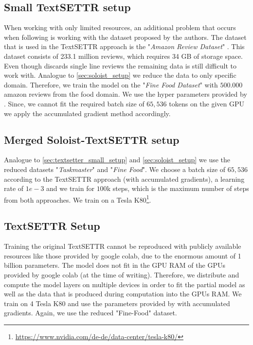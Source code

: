 \documentclass[twocolumn]{tum-article}
\begin{document}
\subsection{Small TextSETTR setup}\label{sec:textsetter_small_setup}
When working with only limited resources, an additional problem that occurs when following \cite{riley2020textsettr} is working with the dataset proposed by the authors. The dataset that is used in the TextSETTR approach is the "\textit{Amazon Review Dataset}" \cite{ni2019justifying}. This dataset consists of 233.1 million reviews, which requires 34 GB of storage space. Even though \cite{riley2020textsettr} discards single line reviews the remaining data is still difficult to work with. Analogue to \autoref{sec:soloist_setup} we reduce the data to only specific domain. Therefore, we train the model on the "\textit{Fine Food Dataset}" \cite{mcauley2013amateurs} with $500.000$ amazon reviews from the food domain. We use the hyper parameters provided by \cite{riley2020textsettr}. Since, we cannot fit the required batch size of $65,536$ tokens on the given GPU we apply the accumulated gradient method accordingly. 
\subsection{Merged Soloist-TextSETTR setup}\label{sec:soloist_textsettr_setup}
Analogue to \autoref{sec:textsetter_small_setup} and \autoref{sec:soloist_setup} we use the reduced datasets "\textit{Taskmaster}" and "\textit{Fine Food}". We choose a batch size of $65,536$ according to the TextSETTR approach (with accumulated gradients), a learning rate of $1e-3$ and we train for $100$k steps, which is the maximum number of steps from both approaches. We train on a Tesla K80\footnote{\url{https://www.nvidia.com/de-de/data-center/tesla-k80/}}.
\subsection{TextSETTR Setup}
Training the original TextSETTR cannot be reproduced with publicly available resources like those provided by google colab, due to the enormous amount of 1 billion parameters. The model does not fit in the GPU RAM of the GPUs provided by google colab (at the time of writing). Therefore, we distribute and compute the model layers on multiple devices in order to fit the partial model as well as the data that is produced during computation into the GPUs RAM. We train on 4 Tesla K80 and use the parameters provided by \cite{riley2020textsettr} with accumulated gradients. Again, we use the reduced "Fine-Food" dataset. 
\end{document}
